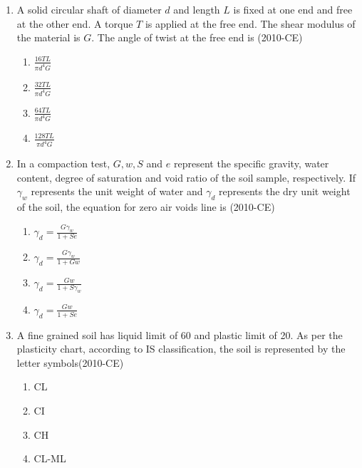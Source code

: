 \documentclass[journal,12pt,twocolumn]{IEEEtran}
\theoremstyle{remark}
\begin{document}
\begin{enumerate}
\item A solid circular shaft of diameter $d$ and length $L$ is fixed at one end and free at the other end. A torque $T$ is applied at the free end. The shear modulus of the material is $G$. The angle of twist at the free end is \hfill{(2010-CE)}

\begin{enumerate}
				\item $\frac{16TL}{\pi d^{4} G}$

\item $\frac{32TL}{\pi d^{4} G}$

\item $\frac{64TL}{\pi d^{4} G}$

\item $\frac{128TL}{\pi d^{4} G}$

\end{enumerate}
	
\item  In a compaction test, $G, w, S$ and $e$ represent the specific gravity, water content, degree of saturation and void ratio of the soil sample, respectively. If $\gamma_{w}$ represents the unit weight of water and $\gamma_{d}$ represents the dry unit weight of the soil, the equation for zero air voids line is \hfill{(2010-CE)}

\begin{enumerate}
    \item $\gamma_{d} = \frac{G \gamma_{w}}{1+Se}     $

\item $\gamma_{d} = \frac{G \gamma_{w}}{1+Gw}     $

\item $\gamma_{d} = \frac{Gw} {1+S\gamma_{w}}     $

\item $\gamma_{d} = \frac{Gw}{1+Se}     $

\end{enumerate}
	

\item A fine grained soil has liquid limit of 60 and plastic limit of 20. As per the plasticity chart, according to IS classification, the soil is represented by the letter symbols\hfill{(2010-CE)}

\begin{enumerate}
	\item CL
	\item CI
	\item CH
	\item CL-ML


\end{enumerate}
\end{enumerate}
\end{document}
